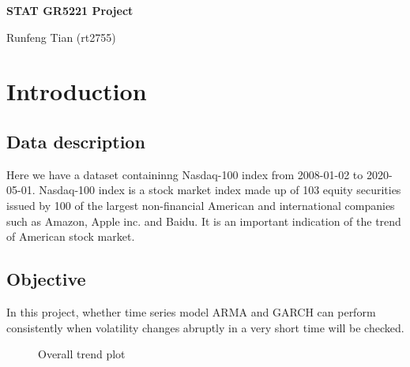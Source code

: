 \documentclass [letterpaper] {article}
\begin{document}
\setcounter{page}{1}
\pagestyle{plain}%

\begin{center}
\textbf{\huge{STAT GR5221 Project}}
\linebreak

\large{Runfeng Tian (rt2755)}
\end{center}

\section{Introduction}
\subsection{Data description}

Here we have a dataset containinng Nasdaq-100 index from 2008-01-02 to 2020-05-01. Nasdaq-100 index is a stock market index made up of 103 equity securities issued by 100 of the largest non-financial American and international companies such as Amazon, Apple inc. and Baidu. It is an important indication of the trend of American stock market. 

\subsection{Objective}

\indent In this project, whether time series model ARMA and GARCH can perform consistently when volatility changes abruptly in a very short time will be checked.\\
\begin{figure}[htp]
\centering
{}
\quad
{}
\caption{Overall trend plot}
\end{figure}
\end{document}
